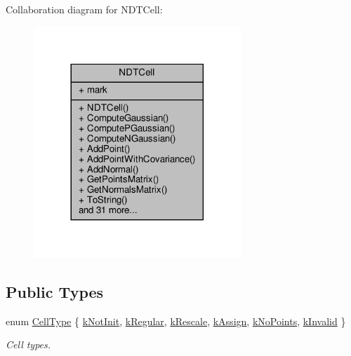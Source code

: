Collaboration diagram for N\+D\+T\+Cell\+:\nopagebreak
\begin{figure}[H]
\begin{center}
\leavevmode
\includegraphics[width=221pt]{db/d0b/classNDTCell__coll__graph}
\end{center}
\end{figure}
\subsection*{Public Types}
\begin{DoxyCompactItemize}
\item 
enum \hyperlink{classNDTCell_abd36cc88f0ef7145a126ed0058ea2f6e}{Cell\+Type} \{ \newline
\hyperlink{classNDTCell_abd36cc88f0ef7145a126ed0058ea2f6ea22641bfb3b710137c5d71ea46a665c69}{k\+Not\+Init}, 
\hyperlink{classNDTCell_abd36cc88f0ef7145a126ed0058ea2f6ea938c14d8711ffb03da856306ecc86522}{k\+Regular}, 
\hyperlink{classNDTCell_abd36cc88f0ef7145a126ed0058ea2f6ea9cb09c570facba9e139c89594581e9c8}{k\+Rescale}, 
\hyperlink{classNDTCell_abd36cc88f0ef7145a126ed0058ea2f6ea1f2ac6cf8e1d79c0129ad06b4cf159f1}{k\+Assign}, 
\newline
\hyperlink{classNDTCell_abd36cc88f0ef7145a126ed0058ea2f6eaca900447ead90b094bc8e0f3eb46ba63}{k\+No\+Points}, 
\hyperlink{classNDTCell_abd36cc88f0ef7145a126ed0058ea2f6ea3d2a2609b1104842678eb392d44a6494}{k\+Invalid}
 \}\begin{DoxyCompactList}\small\item\em Cell types. \end{DoxyCompactList}
\end{DoxyCompactItemize}
